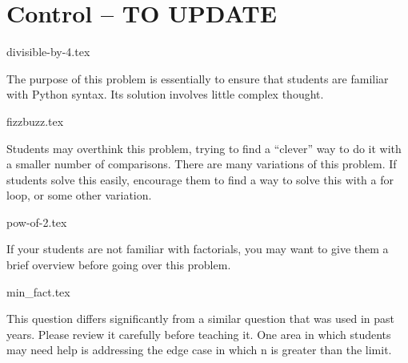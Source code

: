 \documentclass{exam}
\begin{document}
\section{Control -- TO UPDATE}
\begin{questions}
{divisible-by-4.tex}
\begin{questionmeta}
  The purpose of this problem is essentially to ensure that students are familiar with Python syntax. Its solution involves little complex thought. 
\end{questionmeta}
{fizzbuzz.tex}
\begin{questionmeta}
  Students may overthink this problem, trying to find a ``clever'' way to do it with a smaller number of comparisons.
  There are many variations of this problem. If students solve this easily, encourage them to find a way to solve this with a for loop, or some other variation.
\end{questionmeta}
{pow-of-2.tex}
\begin{questionmeta}
  If your students are not familiar with factorials, you may want to give them a brief overview before going over this problem. 
\end{questionmeta}
{min_fact.tex}
\begin{questionmeta}
  This question differs significantly from a similar question that was used in past years. Please review it carefully before teaching it.
  One area in which students may need help is addressing the edge case in which n is greater than the limit.
\end{questionmeta}
\end{questions}
\end{document}
